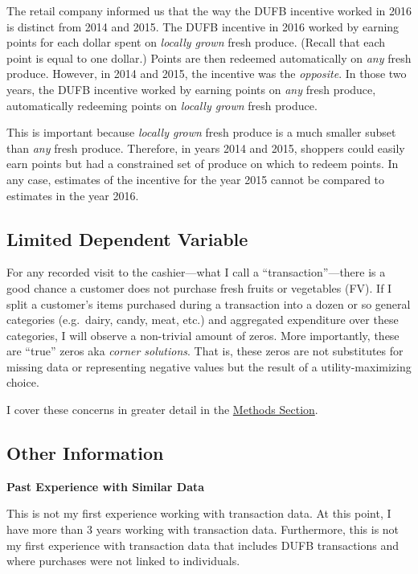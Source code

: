 \documentclass[12pt,letterpaperpaper,]{book}
\begin{document}
The retail company informed us that the way the DUFB incentive worked in
2016 is distinct from 2014 and 2015. The DUFB incentive in 2016 worked
by earning points for each dollar spent on \emph{locally grown} fresh
produce. (Recall that each point is equal to one dollar.) Points are
then redeemed automatically on \emph{any} fresh produce. However, in
2014 and 2015, the incentive was the \emph{opposite}. In those two
years, the DUFB incentive worked by earning points on \emph{any} fresh
produce, automatically redeeming points on \emph{locally grown} fresh
produce.

This is important because \emph{locally grown} fresh produce is a much
smaller subset than \emph{any} fresh produce. Therefore, in years 2014
and 2015, shoppers could easily earn points but had a constrained set of
produce on which to redeem points. In any case, estimates of the
incentive for the year 2015 cannot be compared to estimates in the year
2016.

\subsection*{Limited Dependent
Variable}\label{limited-dependent-variable}

For any recorded visit to the cashier---what I call a
``transaction''---there is a good chance a customer does not purchase
fresh fruits or vegetables (FV). If I split a customer's items purchased
during a transaction into a dozen or so general categories (e.g.~dairy,
candy, meat, etc.) and aggregated expenditure over these categories, I
will observe a non-trivial amount of zeros. More importantly, these are
``true'' zeros aka \emph{corner solutions}. That is, these zeros are not
substitutes for missing data or representing negative values but the
result of a utility-maximizing choice.

I cover these concerns in greater detail in the
\protect\hyperlink{methods-1}{Methods Section}.

\subsection*{Other Information}\label{other-information}

\textbf{Past Experience with Similar Data}

This is not my first experience working with transaction data. At this
point, I have more than 3 years working with transaction data.
Furthermore, this is not my first experience with transaction data that
includes DUFB transactions and where purchases were not linked to
individuals.
\end{document}
